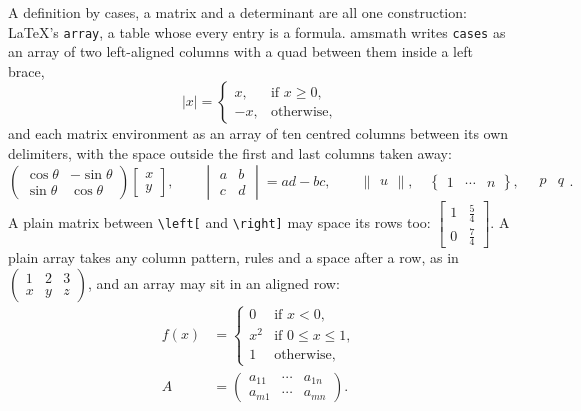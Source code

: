 \documentclass{article}
\numberwithin{equation}{section}
\theoremstyle{definition}
\theoremstyle{remark}
\begin{document}
A definition by cases, a matrix and a determinant are all one construction: \LaTeX's
\texttt{array}, a table whose every entry is a formula. amsmath writes \texttt{cases}
as an array of two left-aligned columns with a quad between them inside a left brace,
\begin{equation}
  |x| = \begin{cases} x, & \text{if } x \ge 0,\\ -x, & \text{otherwise,} \end{cases}
  \label{eq:abs}
\end{equation}
and each matrix environment as an array of ten centred columns between its own
delimiters, with the space outside the first and last columns taken away:
\[
  \begin{pmatrix} \cos\theta & -\sin\theta \\ \sin\theta & \cos\theta \end{pmatrix}
  \begin{bmatrix} x \\ y \end{bmatrix}, \qquad
  \begin{vmatrix} a & b \\ c & d \end{vmatrix} = ad - bc, \qquad
  \begin{Vmatrix} u \end{Vmatrix}, \quad
  \begin{Bmatrix} 1 & \cdots & n \end{Bmatrix}, \quad
  \begin{matrix} p & q \end{matrix}.
\]
A plain matrix between \verb|\left[| and \verb|\right]| may space its rows too:
$\left[ \begin{matrix} 1 & \frac{5}{4} \\[6pt] 0 & \frac{7}{4} \end{matrix} \right]$.
A plain array takes any column pattern, rules and a space after a row, as in
$\left(\begin{array}{c|lr} 1 & 2 & 3 \\[2pt] \hline x & y & z \end{array}\right)$, and
an array may sit in an aligned row:
\begin{align}
  f(x) &= \begin{cases} 0 & \text{if } x < 0,\\[3pt] x^{2} & \text{if } 0 \le x \le 1,\\
            1 & \text{otherwise}, \end{cases} \label{eq:piecewise}\\
  A &= \begin{pmatrix} a_{11} & \cdots & a_{1n} \\ a_{m1} & \cdots & a_{mn} \end{pmatrix}.
\end{align}
\end{document}
